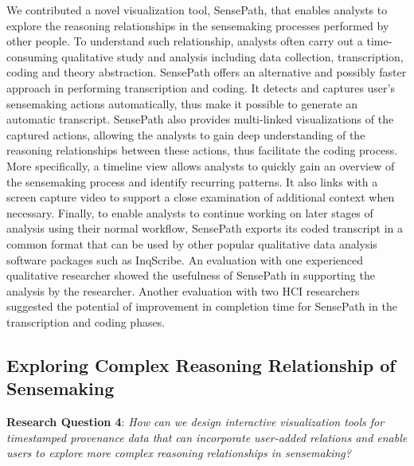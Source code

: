 We contributed a novel visualization tool, SensePath, that enables analysts to explore the reasoning relationships in the sensemaking processes performed by other people. To understand such relationship, analysts often carry out a time-consuming qualitative study and analysis including data collection, transcription, coding and theory abstraction. SensePath offers an alternative and possibly faster approach in performing transcription and coding. It detects and captures user's sensemaking actions automatically, thus make it possible to generate an automatic transcript. SensePath also provides multi-linked visualizations of the captured actions, allowing the analysts to gain deep understanding of the reasoning relationships between these actions, thus facilitate the coding process. More specifically, a timeline view allows analysts to quickly gain an overview of the sensemaking process and identify recurring patterns. It also links with a screen capture video to support a close examination of additional context when necessary. Finally, to enable analysts to continue working on later stages of analysis using their normal workflow, SensePath exports its coded transcript in a common format that can be used by other popular qualitative data analysis software packages such as InqScribe. An evaluation with one experienced qualitative researcher showed the usefulness of SensePath in supporting the analysis by the researcher. Another evaluation with two HCI researchers suggested the potential of improvement in completion time for SensePath in the transcription and coding phases.

\subsection{Exploring Complex Reasoning Relationship of Sensemaking}
\textbf{Research Question 4}: \emph{How can we design interactive visualization tools for timestamped provenance data that can incorporate user-added relations and enable users to explore more complex reasoning relationships in sensemaking?}

